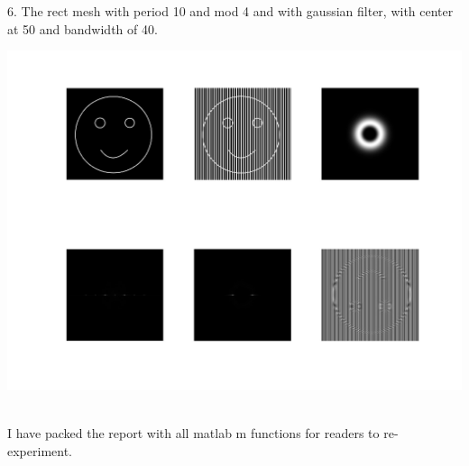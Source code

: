 \documentclass[a4paper]{article}
\begin{document}
6. The rect mesh with period 10 and mod 4 and with gaussian filter, with center at 50 and bandwidth of 40.\\
\centerline{\includegraphics[scale=0.3]{12.jpg}}\\
I have packed the report with all matlab m functions for readers to re-experiment.
\end{document}
